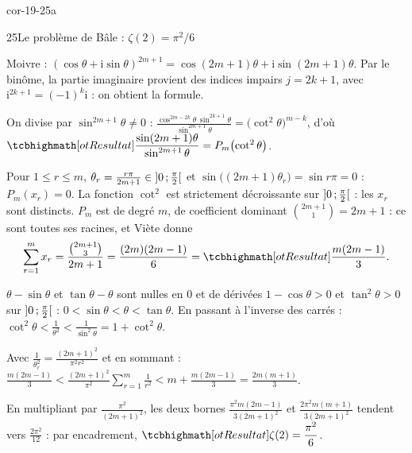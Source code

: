 
\begin{blocLivre}{cor-19-25a}
\begin{corrige}{25}{Le problème de Bâle : $\zeta(2)=\pi^{2}/6$}
\begin{questions}
  \item Moivre : $(\cos\theta+\mathrm{i}\sin\theta)^{2m+1}
    =\cos(2m+1)\theta+\mathrm{i}\sin(2m+1)\theta$. Par le binôme, la partie
    imaginaire provient des indices impairs $j=2k+1$, avec
    $\mathrm{i}^{2k+1}=(-1)^{k}\mathrm{i}$ : on obtient la formule.
  \item On divise par $\sin^{2m+1}\theta\neq0$ :
    $\frac{\cos^{2m-2k}\theta\,\sin^{2k+1}\theta}{\sin^{2m+1}\theta}
    =\bigl(\cot^{2}\theta\bigr)^{m-k}$, d'où
    $\res{\dfrac{\sin(2m+1)\theta}{\sin^{2m+1}\theta}=P_m\bigl(\cot^{2}\theta\bigr)}$.
  \item Pour $1\leqslant r\leqslant m$, $\theta_r=\frac{r\pi}{2m+1}\in\mathopen{]}0\,{;}\,\frac\pi2\mathclose{[}$
    et $\sin\bigl((2m+1)\theta_r\bigr)=\sin r\pi=0$ : $P_m(x_r)=0$. La
    fonction $\cot^{2}$ est strictement décroissante sur $\mathopen{]}0\,{;}\,\frac\pi2\mathclose{[}$ :
    les $x_r$ sont distincts. $P_m$ est de degré $m$, de coefficient
    dominant $\binom{2m+1}{1}=2m+1$ : ce sont toutes ses racines, et Viète
    donne
    \[
    \sum_{r=1}^{m}x_r=\frac{\binom{2m+1}{3}}{2m+1}=\frac{(2m)(2m-1)}{6}
    =\res{\frac{m(2m-1)}{3}} .
    \]
\end{questions}
\begin{questions}[resume]
  \item $\theta-\sin\theta$ et $\tan\theta-\theta$ sont nulles en $0$ et de
    dérivées $1-\cos\theta>0$ et $\tan^{2}\theta>0$ sur
    $\mathopen{]}0\,{;}\,\frac\pi2\mathclose{[}$ : $0<\sin\theta<\theta<\tan\theta$. En passant à
    l'inverse des carrés :
    $\cot^{2}\theta<\frac{1}{\theta^{2}}<\frac{1}{\sin^{2}\theta}=1+\cot^{2}\theta$.
  \item Avec $\frac1{\theta_r^{2}}=\frac{(2m+1)^{2}}{\pi^{2}r^{2}}$ et en
    sommant :
    $\frac{m(2m-1)}{3}<\frac{(2m+1)^{2}}{\pi^{2}}\sum_{r=1}^{m}\frac1{r^{2}}
    <m+\frac{m(2m-1)}{3}=\frac{2m(m+1)}{3}$.
  \item En multipliant par $\frac{\pi^{2}}{(2m+1)^{2}}$, les deux bornes
    $\frac{\pi^{2}m(2m-1)}{3(2m+1)^{2}}$ et
    $\frac{2\pi^{2}m(m+1)}{3(2m+1)^{2}}$ tendent vers
    $\frac{2\pi^{2}}{12}$ : par encadrement,
    $\res{\zeta(2)=\dfrac{\pi^{2}}{6}}$.
\end{questions}
\end{corrige}
\end{blocLivre}

